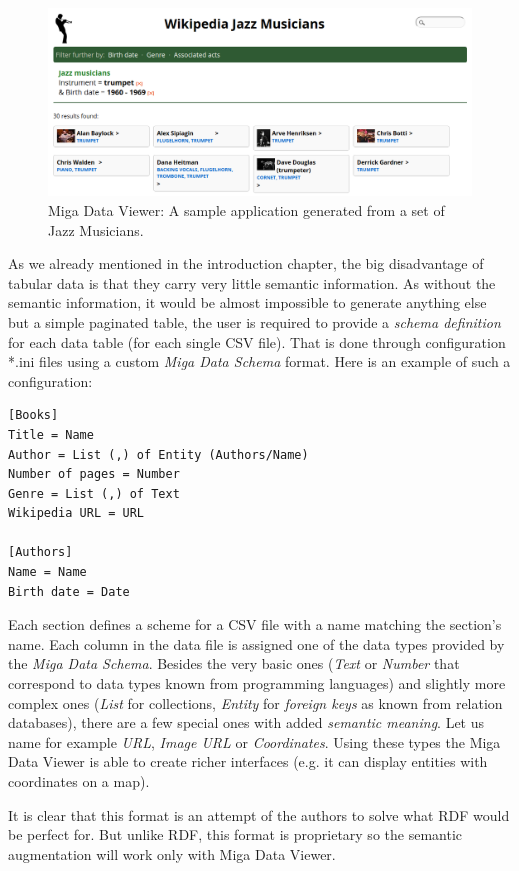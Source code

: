 \begin{figure}
	\centering
	\includegraphics[width=140mm]{img/02_miga_data_viewer.png}
	\caption{Miga Data Viewer: A sample application generated from a set of Jazz Musicians.}
	\label{fig:miga-data-viewer}
\end{figure}

As we already mentioned in the introduction chapter, the big disadvantage of tabular data is that they carry very little semantic information. As without the semantic information, it would be almost impossible to generate anything else but a simple paginated table, the user is required to provide a \emph{schema definition} for each data table (for each single CSV file). That is done through configuration *.ini files using a custom \emph{Miga Data Schema} format. Here is an example of such a configuration:

\scriptsize
\begin{verbatim}
[Books]
Title = Name
Author = List (,) of Entity (Authors/Name)
Number of pages = Number
Genre = List (,) of Text
Wikipedia URL = URL

[Authors]
Name = Name
Birth date = Date
\end{verbatim}
\normalsize

Each section defines a scheme for a CSV file with a name matching the section's name. Each column in the data file is assigned one of the data types provided by the \emph{Miga Data Schema}. Besides the very basic ones (\emph{Text} or \emph{Number} that correspond to data types known from programming languages) and slightly more complex ones (\emph{List} for collections, \emph{Entity} for \emph{foreign keys} as known from relation databases), there are a few special ones with added \emph{semantic meaning}. Let us name for example \emph{URL}, \emph{Image URL} or \emph{Coordinates}. Using these types the Miga Data Viewer is able to create richer interfaces (e.g. it can display entities with coordinates on a map).

It is clear that this format is an attempt of the authors to solve what RDF would be perfect for. But unlike RDF, this format is proprietary so the semantic augmentation will work only with Miga Data Viewer.
